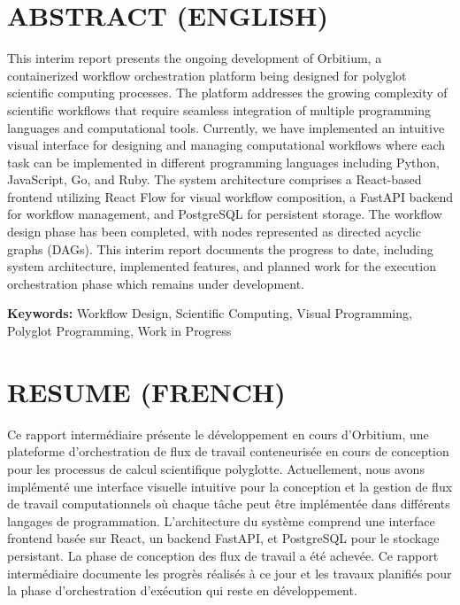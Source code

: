 \documentclass[12pt]{article}
\begin{document}
\newpage
\tableofcontents

\newpage
\listoffigures
{}

\newpage
\listoftables
{}

\newpage
\section*{ABSTRACT (ENGLISH)}

\noindent
\parbox{\textwidth}{%
This interim report presents the ongoing development of Orbitium, a containerized workflow orchestration platform being designed for polyglot scientific computing processes. The platform addresses the growing complexity of scientific workflows that require seamless integration of multiple programming languages and computational tools. Currently, we have implemented an intuitive visual interface for designing and managing computational workflows where each task can be implemented in different programming languages including Python, JavaScript, Go, and Ruby. The system architecture comprises a React-based frontend utilizing React Flow for visual workflow composition, a FastAPI backend for workflow management, and PostgreSQL for persistent storage. The workflow design phase has been completed, with nodes represented as directed acyclic graphs (DAGs). This interim report documents the progress to date, including system architecture, implemented features, and planned work for the execution orchestration phase which remains under development.
}

\vspace{1cm}

\noindent
\textbf{Keywords:} Workflow Design, Scientific Computing, Visual Programming, Polyglot Programming, Work in Progress

\vspace{2cm}

\section*{RESUME (FRENCH)}

\noindent
\parbox{\textwidth}{%
Ce rapport intermédiaire présente le développement en cours d'Orbitium, une plateforme d'orchestration de flux de travail conteneurisée en cours de conception pour les processus de calcul scientifique polyglotte. Actuellement, nous avons implémenté une interface visuelle intuitive pour la conception et la gestion de flux de travail computationnels où chaque tâche peut être implémentée dans différents langages de programmation. L'architecture du système comprend une interface frontend basée sur React, un backend FastAPI, et PostgreSQL pour le stockage persistant. La phase de conception des flux de travail a été achevée. Ce rapport intermédiaire documente les progrès réalisés à ce jour et les travaux planifiés pour la phase d'orchestration d'exécution qui reste en développement.
}
\end{document}
